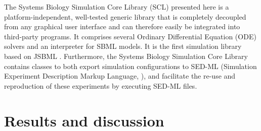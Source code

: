 \documentclass[10pt]{bmc_article}
\newenvironment{bmcformat}{\baselineskip20pt\sloppy\setboolean{publ}{false}}{\baselineskip20pt\sloppy}
\begin{document}
\begin{bmcformat}
%
%
%
%
The Systems Biology Simulation Core Library (SCL) presented here is a platform-independent,
well-tested generic library that is completely decoupled from any graphical
user interface and can therefore easily be integrated into third-party programs.
It comprises several Ordinary Differential Equation (ODE)
solvers and an interpreter for SBML models. It is the first simulation library
based on JSBML \cite{Draeger2011b}. 
%
%
Furthermore, the Systems Biology Simulation Core Library contains classes to both export
simulation configurations to SED-ML (Simulation Experiment Description Markup Language,
\cite{Waltemath2011}), and facilitate the re-use and reproduction of these
experiments by executing SED-ML files.

\section*{Results and discussion}


\end{bmcformat}
\end{document}
